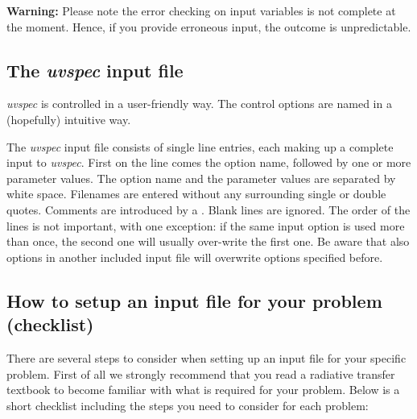 {\bf Warning:} Please note the error checking on input variables is
not complete at the moment. Hence, if you provide erroneous input, the
outcome is unpredictable.

\subsection{The {\sl uvspec} input file}

{\sl uvspec}
is controlled in a user-friendly way. The control options are named in
a (hopefully) intuitive way. 

The {\sl uvspec} input file consists of single line entries, each
making up a complete input to {\sl uvspec}. First on the
line comes the option name, followed by one or more parameter
values. The option name and the parameter values are separated by
white space.  Filenames are entered without any surrounding single or
double quotes.  Comments are introduced by a \code{\#}. Blank lines
are ignored. The order of the lines is not important, with one
exception: if the same input option is used more than once, the second
one will usually over-write the first one. Be aware that also options
in another included input file will overwrite options specified
before.


\subsection{How to setup an input file for your problem (checklist)}

There are several steps to consider when setting up an input file for
your specific problem. First of all we strongly recommend that you
read a radiative transfer textbook to become familiar with what is
required for your problem. Below is a short checklist including the
steps you need to consider for each problem:

